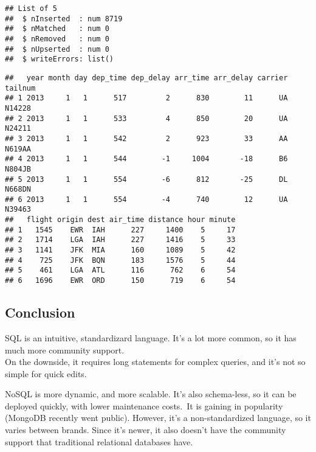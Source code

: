 \documentclass[]{article}
\newenvironment{Shaded}{\begin{snugshade}}{\end{snugshade}}
\newcommand{\KeywordTok}[1]{\textcolor[rgb]{0.13,0.29,0.53}{\textbf{#1}}}
\newcommand{\DataTypeTok}[1]{\textcolor[rgb]{0.13,0.29,0.53}{#1}}
\newcommand{\StringTok}[1]{\textcolor[rgb]{0.31,0.60,0.02}{#1}}
\newcommand{\CommentTok}[1]{\textcolor[rgb]{0.56,0.35,0.01}{\textit{#1}}}
\newcommand{\OperatorTok}[1]{\textcolor[rgb]{0.81,0.36,0.00}{\textbf{#1}}}
\newcommand{\NormalTok}[1]{#1}
\begin{document}
\begin{Shaded}
\end{Shaded}

\begin{verbatim}
## List of 5
##  $ nInserted  : num 8719
##  $ nMatched   : num 0
##  $ nRemoved   : num 0
##  $ nUpserted  : num 0
##  $ writeErrors: list()
\end{verbatim}

\begin{Shaded}
\end{Shaded}

\begin{verbatim}
##   year month day dep_time dep_delay arr_time arr_delay carrier tailnum
## 1 2013     1   1      517         2      830        11      UA  N14228
## 2 2013     1   1      533         4      850        20      UA  N24211
## 3 2013     1   1      542         2      923        33      AA  N619AA
## 4 2013     1   1      544        -1     1004       -18      B6  N804JB
## 5 2013     1   1      554        -6      812       -25      DL  N668DN
## 6 2013     1   1      554        -4      740        12      UA  N39463
##   flight origin dest air_time distance hour minute
## 1   1545    EWR  IAH      227     1400    5     17
## 2   1714    LGA  IAH      227     1416    5     33
## 3   1141    JFK  MIA      160     1089    5     42
## 4    725    JFK  BQN      183     1576    5     44
## 5    461    LGA  ATL      116      762    6     54
## 6   1696    EWR  ORD      150      719    6     54
\end{verbatim}

\subsection{Conclusion}\label{conclusion}

SQL is an intuitive, standardizard language. It's a lot more common, so
it has much more community support.\\
On the downside, it requires long statements for complex queries, and
it's not so simple for quick edits.

NoSQL is more dynamic, and more scalable. It's also schema-less, so it
can be deployed quickly, with lower maintenance costs.~It is gaining in
popularity (MongoDB recently went public). However, it's a
non-standardized language, so it varies between brands. Since it's
newer, it also doesn't have the community support that traditional
relational databases have.
\end{document}

